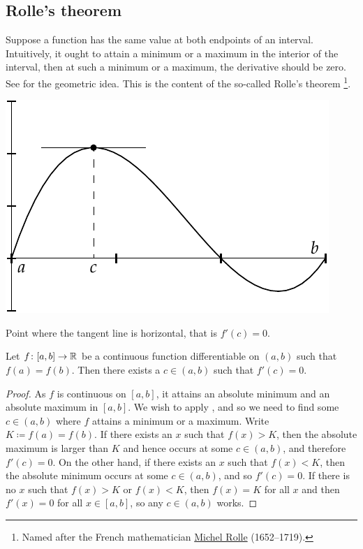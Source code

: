 \subsection{Rolle's theorem}

Suppose a function has the same value at both endpoints of an interval.
Intuitively, it ought to attain a minimum or a maximum in the interior of the
interval,
then at such a minimum or a maximum, the derivative should be zero.
See  for the geometric idea.  This is the content of the
so-called Rolle's theorem%
\footnote{Named after the French mathematician
\href{https://en.wikipedia.org/wiki/Michel_Rolle}{Michel Rolle}
(1652--1719).}.

\begin{myfigureht}
\includegraphics{figures/rollefig}
\caption{Point where the tangent line is horizontal, that is $f'(c) =
0$.\label{rollefig}}
\end{myfigureht}

\begin{thm}[Rolle] \label{thm:rolle}
Let $f \colon [a,b] \to {\mathbb{R}}$ be a continuous function
differentiable on $(a,b)$ such that $f(a) = f(b)$.
Then there exists a $c \in (a,b)$ such that $f'(c) = 0$.
\end{thm}

\begin{proof}
As $f$ is continuous on $[a,b]$, it attains an absolute minimum and an
absolute 
maximum in $[a,b]$.  We wish to apply , and
so we need to find some $c \in (a,b)$ where $f$ attains a minimum or a
maximum.
Write $K \coloneqq f(a) = f(b)$.
If there exists an $x$ such that $f(x) > K$, then the absolute
maximum is larger than $K$ and hence occurs at some $c \in (a,b)$, and
therefore $f'(c) = 0$.  On the other hand, if there exists an $x$
such that $f(x) < K$, then the absolute minimum occurs at some
$c \in (a,b)$, and so $f'(c) = 0$.  If there is no $x$ such that
$f(x) > K$ or
$f(x) < K$, then $f(x) = K$ for all $x$ and then
$f'(x) = 0$ for all $x \in [a,b]$, so any $c \in (a,b)$ works.
\end{proof}

